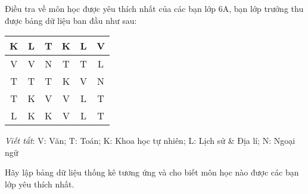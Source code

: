 \begin{vd}
	Điều tra về môn học được yêu thích nhất của các bạn lớp 6A, bạn lớp trưởng thu được bảng dữ liệu ban đầu như sau:
	\begin{center}
		\begin{tabular}{|c|c|c|c|c|c|}
			\hline
			K&	L&	T&	K&	L&	V\\
			\hline
			V&	V&	N&	T&	T&	L\\
			\hline
			T&	T&	T&	K&	V&	N\\
			\hline
			T&	K&	V&	V&	L&	T\\
			\hline
			L&	K&	K&	V&	L&	T\\
			\hline
		\end{tabular}
	\end{center}
	\textit{Viết tắt}: V: Văn; T: Toán; K: Khoa học tự nhiên; L: Lịch sử \& Địa lí; N: Ngoại ngữ
	
	Hãy lập bảng dữ liệu thống kê tương ứng và cho biết môn học nào được các bạn lớp   yêu thích nhất.
\end{vd}
